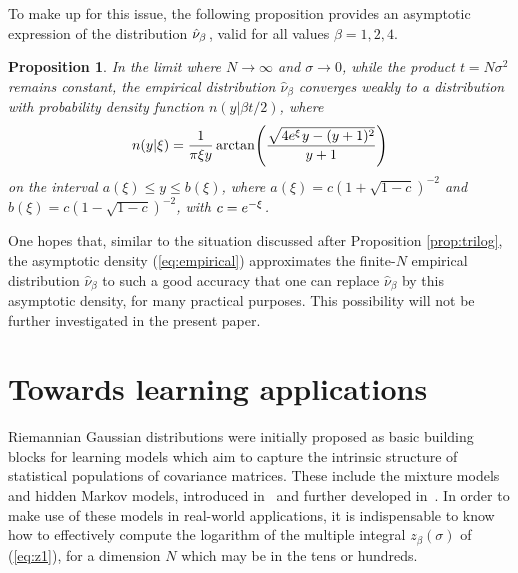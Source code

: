 \documentclass[draftclsnofoot]{IEEEtran}
\newtheorem{prop}{Proposition}
\begin{document}
To make up for this issue, the following proposition provides an asymptotic expression of the distribution $\hat{\nu}_\beta\hspace{0.03cm}$, valid for all values $\beta = 1, 2, 4$.
\begin{prop} \label{prop:empirical}
  In the limit where $N \rightarrow \infty$ and $\sigma \rightarrow 0$, while the product $t = N\sigma^2$ remains constant, the empirical distribution $\hat{\nu}_\beta$ converges weakly to a distribution with probability density function $n(y|\beta t/2)$, where
\begin{equation}\label{eq:empirical}
  n(y|\xi) = \frac{1}{\pi \xi y}\,\mathrm{arctan}\!\left(\frac{\sqrt{4e^\xi\hspace{0.02cm} y - (y+1)^2}}{y+1}\right) 
\end{equation}
on the interval $a(\xi) \leq y \leq b(\xi)$, where $a(\xi) = c(1+\sqrt{1-c})^{-2}$ and $b(\xi) = c(1-\sqrt{1-c})^{-2}$, with $c = e^{-\xi}\hspace{0.03cm}$.
\end{prop}
One hopes that, similar to the situation discussed after Proposition \ref{prop:trilog}, the asymptotic density (\ref{eq:empirical}) approximates the finite-$N$ empirical distribution $\hat{\nu}_\beta$ to such a good accuracy that one can replace $\hat{\nu}_\beta$ by this asymptotic density, for many practical purposes. This possibility will not be further investigated in the present paper.

\section{Towards learning applications} \label{sec:application}

Riemannian Gaussian distributions were initially proposed as basic building blocks for learning models which aim to capture the intrinsic structure of statistical populations of covariance matrices. These include the mixture models and hidden Markov models, introduced in~\cite{Sa16}\cite{mtnshmm} and further developed in~\cite{QT21}. In order to make use of these models in real-world applications, it is indispensable to know how to effectively compute the logarithm of the multiple integral $z_\beta(\sigma)$ of (\ref{eq:z1}),  for a dimension $N$ which may be in the tens or hundreds. 
\end{document}
